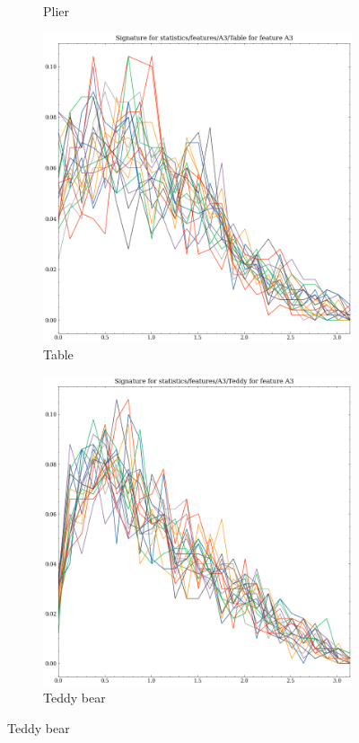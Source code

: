 \begin{figure}[ht]
\begin{subfigure}[b]{0.23\textwidth}
        \caption{Plier}
        \label{fig:features-statistics-A3-v}    
    \end{subfigure}
    \hfill
    \begin{subfigure}[b]{0.23\textwidth}
        \includegraphics[width=\textwidth]{assets/feature_extraction/A3/Table.png}
        \caption{Table}
        \label{fig:features-statistics-A3-w}    
    \end{subfigure}
    \hfill
    \begin{subfigure}[b]{0.23\textwidth}
        \includegraphics[width=\textwidth]{assets/feature_extraction/A3/Teddy.png}
        \caption{Teddy bear}
        \label{fig:features-statistics-A3-x}    
    \end{subfigure}
    \hfill


\end{figure}
